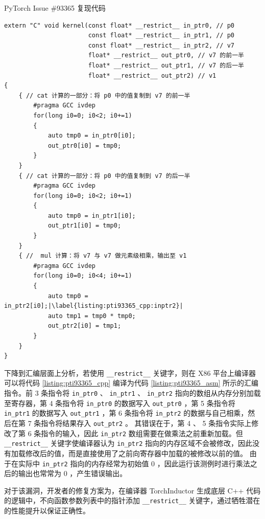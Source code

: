\begin{listing}[]
    \caption{PyTorch Issue \#93365 复现代码}
    \label{listing:pti93365_cpp}
\begin{verbatim}
extern "C" void kernel(const float* __restrict__ in_ptr0, // p0
                       const float* __restrict__ in_ptr1, // p0
                       const float* __restrict__ in_ptr2, // v7
                       float* __restrict__ out_ptr0, // v7 的前一半
                       float* __restrict__ out_ptr1, // v7 的后一半
                       float* __restrict__ out_ptr2) // v1
{
    { // cat 计算的一部分：将 p0 中的值复制到 v7 的前一半
        #pragma GCC ivdep
        for(long i0=0; i0<2; i0+=1)
        {
            auto tmp0 = in_ptr0[i0];
            out_ptr0[i0] = tmp0;
        }
    }
    { // cat 计算的一部分：将 p0 中的值复制到 v7 的后一半
        #pragma GCC ivdep
        for(long i0=0; i0<2; i0+=1)
        {
            auto tmp0 = in_ptr1[i0];
            out_ptr1[i0] = tmp0;
        }
    }
    { //  mul 计算：将 v7 与 v7 做元素级相乘，输出至 v1
        #pragma GCC ivdep
        for(long i0=0; i0<4; i0+=1)
        {
            auto tmp0 = in_ptr2[i0];|\label{listing:pti93365_cpp:inptr2}|
            auto tmp1 = tmp0 * tmp0;
            out_ptr2[i0] = tmp1;
        }
    }
}
\end{verbatim}
\end{listing}

下降到汇编层面上分析，若使用 \texttt{\_\_restrict\_\_} 关键字，则在 X86 平台上编译器可以将代码 \ref{listing:pti93365_cpp} 编译为代码 \ref{listing:pti93365_asm} 所示的汇编指令。前 3 条指令将 \texttt{in\_ptr0} 、 \texttt{in\_ptr1} 、 \texttt{in\_ptr2} 指向的数组从内存分别加载至寄存器，第 4 条指令将 \texttt{in\_ptr0} 的数据写入 \texttt{out\_ptr0} ，第 5 条指令将 \texttt{in\_ptr1} 的数据写入 \texttt{out\_ptr1} ，第 6 条指令将 \texttt{in\_ptr2} 的数据与自己相乘，然后在第 7 条指令将结果存入 \texttt{out\_ptr2} 。
其错误在于，第 4 、 5 条指令实际上修改了第 6 条指令的输入，因此 \texttt{in\_ptr2} 数组需要在做乘法之前重新加载。但 \texttt{\_\_restrict\_\_} 关键字使编译器认为 \texttt{in\_ptr2} 指向的内存区域不会被修改，因此没有加载修改后的值，而是直接使用了之前向寄存器中加载的被修改以前的值。
由于在实际中 \texttt{in\_ptr2} 指向的内存经常为初始值 0 ，因此运行该测例时进行乘法之后的输出也常常为 0 ，产生错误输出。

对于该漏洞，开发者的修复方案为，在编译器 TorchInductor 生成底层 C++ 代码的逻辑中，不向函数参数列表中的指针添加 \texttt{\_\_restrict\_\_} 关键字，通过牺牲潜在的性能提升以保证正确性。

